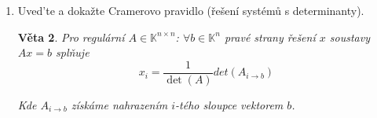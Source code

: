 \documentclass[10pt,a4paper]{article}
\theoremstyle{plain}
\newtheorem{veta}{Věta}
\theoremstyle{definition}
\begin{document}
\begin{enumerate}
\begin{veta}
\begin{proof}
\[ \begin{vmatrix}
\rule[1ex]{5em}{0.4pt}\\
0\ ...\ 0\ 1\ 0\ ...\ 0 \\
\rule[.5ex]{5em}{0.4pt}
\end{vmatrix} = \begin{vmatrix}
\rule[1ex]{5em}{0.4pt}\\
\rule[1ex]{1.5em}{0.4pt}\ \ e_j^T\ \rule[1ex]{1.5em}{0.4pt}\\
\rule[.5ex]{5em}{0.4pt}
\end{vmatrix} = (-1)^{i+1} \begin{vmatrix}
\rule[1ex]{1.5em}{0.4pt}\ \ e_j^T\ \rule[1ex]{1.5em}{0.4pt}\\
\rule[1ex]{5em}{0.4pt}\\
\rule[.5ex]{5em}{0.4pt}
\end{vmatrix}
 = (-1)^{i+1+j+1} \begin{vmatrix}
e_1^T \rule[1ex]{3.2em}{0.4pt}\\
\rule[1ex]{5em}{0.4pt}\\
\rule[.5ex]{5em}{0.4pt}
\end{vmatrix}  \]


\[
 = (-1)^{i+j} \det \left( \ 
\begin{array}{|c|c|}
\hline
1 & 0^T \\
\hline
0 & A^{i,j} \\
\hline
\end{array} \  \right)
\]

Nenulové budou permutace s pevným bodem $p(1)=1$, ostatní lze pominout, to odpovídá permutacím $S_{n-1}$.

\[ = (-1)^{i+j} det(A^{i,j})\]

Tedy pro první rovnici:

\[ = \sum^n_{j=1} a_{i,j}(-1)^{i+j}det(A^{i,j})\]



\end{proof}
\end{veta}

\item Uved'te a dokažte Cramerovo pravidlo (řešení systémů s determinanty).

\begin{veta}
Pro regulární $A \in \mathbb{K}^{n \times n}$: $\forall b \in \mathbb{K}^n$ pravé strany řešení $x$ soustavy $Ax = b$ splňuje
  \[x_i = \frac1{\det(A)}det(A_{i \to b})\]

Kde $A_{i \to b}$ získáme nahrazením $i$-tého sloupce vektorem $b$.


\end{veta}
\end{enumerate}
\end{document}

